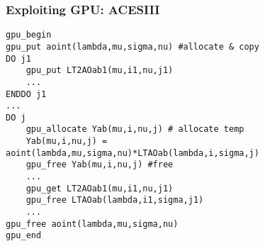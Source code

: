 \documentclass{beamer}
\begin{document}
\begin{frame}[fragile=singleslide]\frametitle{Exploiting GPU: ACESIII}
\fontsize{7pt}{7.2}\selectfont
\begin{lstlisting}
gpu_begin
gpu_put aoint(lambda,mu,sigma,nu) #allocate & copy
DO j1
    gpu_put LT2AOab1(mu,i1,nu,j1)
    ...
ENDDO j1
...
DO j
    gpu_allocate Yab(mu,i,nu,j) # allocate temp
    Yab(mu,i,nu,j) = aoint(lambda,mu,sigma,nu)*LTAOab(lambda,i,sigma,j)
    gpu_free Yab(mu,i,nu,j) #free
    ...
    gpu_get LT2AOab1(mu,i1,nu,j1)
    gpu_free LTAOab(lambda,i1,sigma,j1)
    ...
gpu_free aoint(lambda,mu,sigma,nu)
gpu_end
\end{lstlisting}
\end{frame}
\end{document}
